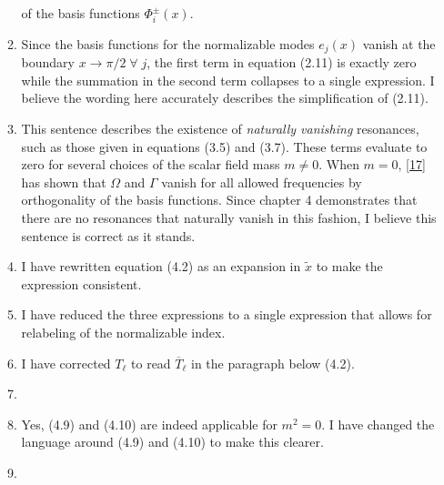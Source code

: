 \documentclass[11pt,letterpaper]{article}
\begin{document}
\begin{enumerate}
\begin{enumerate}
        of the basis functions $\Phi^\pm_i(x)$.
        \item Since the basis functions for the normalizable modes $e_j(x)$ vanish at the boundary
        ${x \to \pi/2 \; \forall \; j}$, the first term in equation (2.11) is exactly zero while the 
        summation in the second term collapses to a single expression. I believe the wording here 
        accurately describes the simplification of (2.11).
        \item This sentence describes the existence of \emph{naturally vanishing} resonances, such 
        as those given in equations (3.5) and (3.7). These terms evaluate to zero for several choices 
        of the scalar field mass $m \neq 0$. When $m = 0$, [\href{https://arxiv.org/pdf/1407.6273.pdf}{17}]
        has shown that $\Omega$ and $\Gamma$ vanish for all allowed frequencies by orthogonality of the 
        basis functions. Since chapter 4 demonstrates that there are no resonances that naturally 
        vanish in this fashion, I believe this sentence is correct as it stands.
        \item I have rewritten equation (4.2) as an expansion in $\tilde x$ to make the expression consistent.
        \item I have reduced the three expressions to a single expression that allows for relabeling of the normalizable index.
        \item I have corrected $T_\ell$ to read $\overline{T}_\ell$ in the paragraph below (4.2).
        \item 
        \item Yes, (4.9) and (4.10) are indeed applicable for $m^2 = 0$. I have changed the language around (4.9) and (4.10) to make this clearer.
        \item
    \end{enumerate}   
\end{enumerate}
\end{document}
